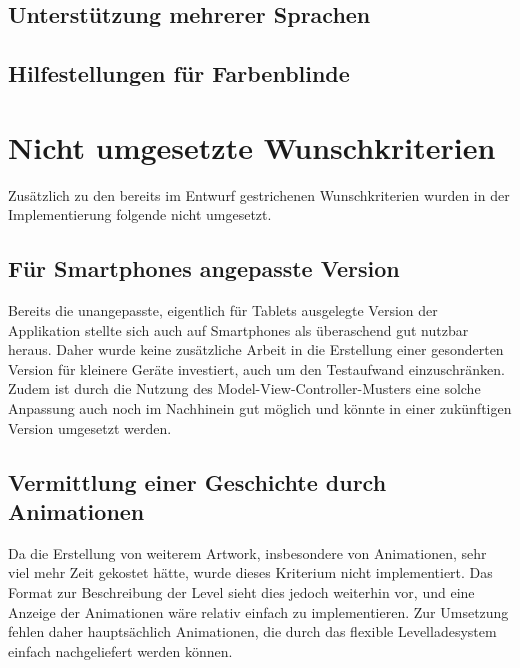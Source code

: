 \subsection{Unterstützung mehrerer Sprachen}

\subsection{Hilfestellungen für Farbenblinde}


\section{Nicht umgesetzte Wunschkriterien}

Zusätzlich zu den bereits im Entwurf gestrichenen Wunschkriterien wurden in der Implementierung folgende nicht umgesetzt.

\subsection{Für Smartphones angepasste Version}

Bereits die unangepasste, eigentlich für Tablets ausgelegte Version der Applikation stellte sich auch auf Smartphones als überaschend gut nutzbar heraus.
Daher wurde keine zusätzliche Arbeit in die Erstellung einer gesonderten Version für kleinere Geräte investiert, auch um den Testaufwand einzuschränken.
Zudem ist durch die Nutzung des Model-View-Controller-Musters eine solche Anpassung auch noch im Nachhinein gut möglich und könnte in einer zukünftigen Version umgesetzt werden.

\subsection{Vermittlung einer Geschichte durch Animationen}

Da die Erstellung von weiterem Artwork, insbesondere von Animationen, sehr viel mehr Zeit gekostet hätte, wurde dieses Kriterium nicht implementiert.
Das Format zur Beschreibung der Level sieht dies jedoch weiterhin vor, und eine Anzeige der Animationen wäre relativ einfach zu implementieren.
Zur Umsetzung fehlen daher hauptsächlich Animationen, die durch das flexible Levelladesystem einfach nachgeliefert werden können.

